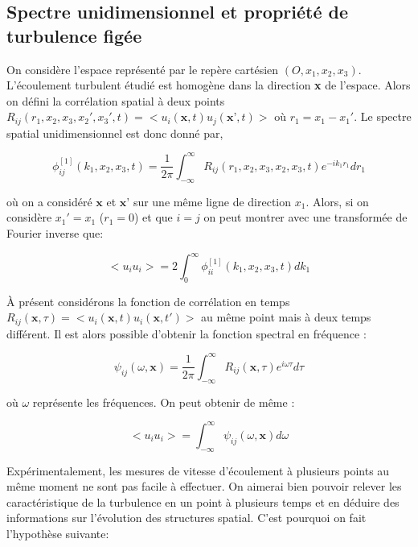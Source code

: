 \documentclass[12pt]{article}
\theoremstyle{plain}
\theoremstyle{remark}
\begin{document}
	\subsection{Spectre unidimensionnel et propriété de turbulence figée}
	
		On considère l'espace représenté par le repère cartésien $(O,x_1,x_2,x_3)$. L'écoulement turbulent étudié est homogène dans la direction \textbf{x} de l'espace. Alors on défini la corrélation spatial à deux points \\$R_{ij}(r_1, x_2,x_3,x_2',x_3',t) = <u_i(\textbf{x},t)u_j(\textbf{x'},t)>$ où $r_1=x_1-x_1'$. Le spectre spatial unidimensionnel est donc donné par,
		
		\begin{equation}
			\phi_{ij}^{[1]}(k_1,x_2,x_3,t)=\frac{1}{2\pi}\int_{-\infty}^{\infty}R_{ij}(r_1,x_2,x_3,x_2,x_3,t)e^{-ik_1r_1}dr_1
		\end{equation}
	
		où on a considéré $\textbf{x}$ et $\textbf{x'}$ sur une même ligne de direction $x_1$. Alors, si on considère $x_1'=x_1$ ($r_1=0$) et que $i=j$ on peut montrer avec une transformée de Fourier inverse que:
		
		\begin{equation}
			<u_iu_i>=2\int_{0}^{\infty}\phi_{ii}^{[1]}(k_1,x_2,x_3,t)dk_1
		\end{equation}
	
		À présent considérons la fonction de corrélation en temps $R_{ij}(\textbf{x},\tau)=<u_i(\textbf{x},t)u_i(\textbf{x},t')>$ au même point mais à deux temps différent. Il est alors possible d'obtenir la fonction spectral en fréquence :
		
		\begin{equation}
			\psi_{ij}(\omega,\textbf{x})=\frac{1}{2\pi}\int_{-\infty}^{\infty}R_{ij}(\textbf{x},\tau)e^{i\omega\tau}d\tau
		\end{equation}
	
		où $\omega$ représente les fréquences. On peut obtenir de même : 
		
		\begin{equation}
			<u_iu_i>=\int_{-\infty}^{\infty}\psi_{ij}(\omega,\textbf{x})d\omega
		\end{equation}
		
		
		Expérimentalement, les mesures de vitesse d'écoulement à plusieurs points au même moment ne sont pas facile à effectuer. On aimerai bien pouvoir relever les caractéristique de la turbulence en un point à plusieurs temps et en déduire des informations sur l'évolution des structures spatial. C'est pourquoi on fait l'hypothèse suivante:
		
\end{document}
